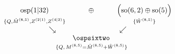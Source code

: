 \begin{equation}
\label{e:thediagram}
\begin{matrix}
\text{osp}(1|32) & \oplus & \Big( \text{so}(6,2)\oplus \text{so}(5)\Big)\\
{\scriptstyle \{ Q,\hat M^{(8,5)}, Z^{(2|1)}, Z^{(4|2)}\}} & & {\scriptstyle
\{ \hat{W}^{(8,5)} \}}\\
\qquad\qquad\quad\searrow & & \swarrow\qquad\qquad\qquad\\
& \ospsixtwo\\
& \hskip-10em
  \hbox to 0pt{$\scriptstyle \{ Q,\,  M^{(8,5)} = \hat{M}^{(8,5)} + \hat{W}^{(8,5)}\}$\hss}
\end{matrix}
\end{equation}

